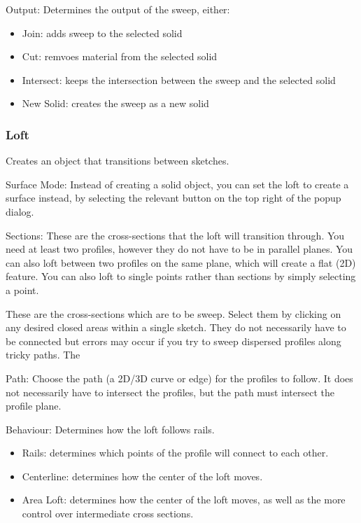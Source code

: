 Output:
Determines the output of the sweep, either:
\begin{itemize}
    \item Join: adds sweep to the selected solid
    \item Cut: remvoes material from the selected solid
    \item Intersect: keeps the intersection between the sweep and the selected solid
    \item New Solid: creates the sweep as a new solid
\end{itemize}

\subsubsection{Loft}
Creates an object that transitions between sketches.

Surface Mode:
Instead of creating a solid object, you can set the loft to create a surface instead, by selecting the relevant button on the top right of the popup dialog.

Sections:
These are the cross-sections that the loft will transition through. You need at least two profiles, however they do not have to be in parallel planes. You can also loft between two profiles on the same plane, which will create a flat (2D) feature. You can also loft to single points rather than sections by simply selecting a point.


These are the cross-sections which are to be sweep. Select them by clicking on any desired closed areas within a single sketch. They do not necessarily have to be connected but errors may occur if you try to sweep dispersed profiles along tricky paths. The

Path:
Choose the path (a 2D/3D curve or edge) for the profiles to follow. It does not necessarily have to intersect the profiles, but the path must intersect the profile plane.

Behaviour:
Determines how the loft follows rails.

\begin{itemize}
    \item Rails: determines which points of the profile will connect to each other.
    \item Centerline: determines how the center of the loft moves.
    \item Area Loft: determines how the center of the loft moves, as well as the more control over intermediate cross sections.
\end{itemize}

